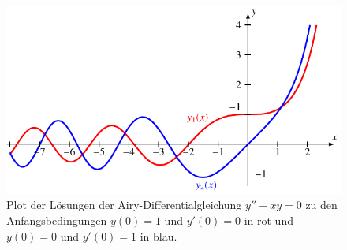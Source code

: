 \begin{figure}
    \centering
    \includegraphics{papers/0f1/images/airy.pdf}
    \caption{Plot der Lösungen der Airy-Differentialgleichung $y''-xy=0$
    zu den Anfangsbedingungen $y(0)=1$ und $y'(0)=0$ in {\color{red}rot}
    und $y(0)=0$ und $y'(0)=1$ in {\color{blue}blau}.
    \label{0f1:airy:plot:vorgabe}}
\end{figure}